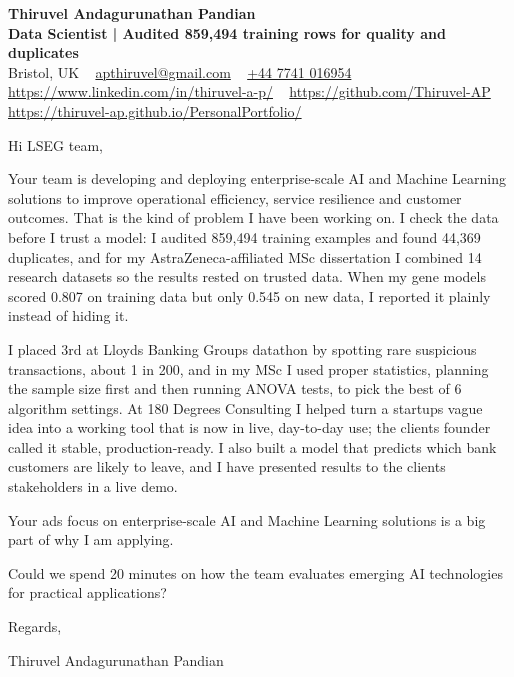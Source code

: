 \documentclass[11pt,a4paper]{article}
\newcommand{\num}[1]{\textbf{#1}}   %
\begin{document}
\raggedright
\pagestyle{empty}

\begin{center}
    {\LARGE \color{linkblue} \textbf{Thiruvel Andagurunathan Pandian}}\\[0.2cm]
    {\color{headernavy}\small\textbf{Data Scientist | Audited \num{859,494} training rows for quality and duplicates}}\\[0.2cm]
    {\small Bristol, UK\nobreak\ \,\textbar\, \href{mailto:apthiruvel@gmail.com}{apthiruvel@gmail.com}\nobreak\ \,\textbar\, \href{tel:+447741016954}{+44 7741 016954}\nobreak\ \,\textbar\, \href{https://www.linkedin.com/in/thiruvel-a-p/}{https://www.linkedin.com/in/thiruvel-a-p/}\nobreak\ \,\textbar\, \href{https://github.com/Thiruvel-AP}{https://github.com/Thiruvel-AP}\nobreak\ \,\textbar\, \href{https://thiruvel-ap.github.io/PersonalPortfolio/}{https://thiruvel-ap.github.io/PersonalPortfolio/}}

\end{center}

\vspace{0.4cm}

\noindent
Hi LSEG team,

Your team is developing and deploying enterprise-scale AI and Machine Learning solutions to improve operational efficiency, service resilience and customer outcomes. That is the kind of problem I have been working on. I check the data before I trust a model: I audited 859,494 training examples and found 44,369 duplicates, and for my AstraZeneca-affiliated MSc dissertation I combined 14 research datasets so the results rested on trusted data. When my gene models scored 0.807 on training data but only 0.545 on new data, I reported it plainly instead of hiding it.

I placed 3rd at Lloyd\textquotesingle{}s Banking Group\textquotesingle{}s datathon by spotting rare suspicious transactions, about 1 in 200, and in my MSc I used proper statistics, planning the sample size first and then running ANOVA tests, to pick the best of 6 algorithm settings. At 180 Degrees Consulting I helped turn a startup\textquotesingle{}s vague idea into a working tool that is now in live, day-to-day use; the client\textquotesingle{}s founder called it \textquotedbl{}stable, production-ready\textquotedbl{}. I also built a model that predicts which bank customers are likely to leave, and I have presented results to the client\textquotesingle{}s stakeholders in a live demo.

Your ad\textquotesingle{}s focus on enterprise-scale AI and Machine Learning solutions is a big part of why I am applying.

Could we spend 20 minutes on how the team evaluates emerging AI technologies for practical applications?

\vspace{0.5cm}

Regards,

Thiruvel Andagurunathan Pandian
\end{document}
